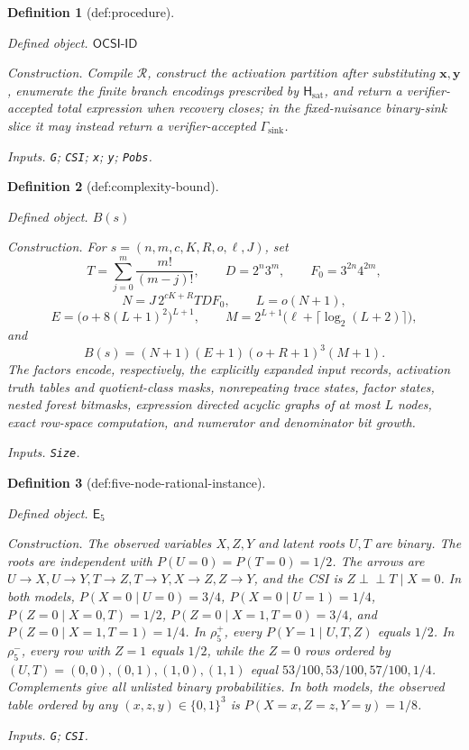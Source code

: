 \documentclass{article}
\newtheorem{definition}{Definition}
\begin{document}
\begin{definition}[def:procedure]\label{def:procedure}
\par\smallskip\noindent\emph{Defined object.} \(\mathsf{OCSI\text{-}ID}\)
\par\smallskip\noindent\emph{Construction.} Compile \(\mathcal R\), construct the activation partition after substituting \(\mathbf x,\mathbf y\), enumerate the finite branch encodings prescribed by \(\mathsf H_{\mathrm{sat}}\), and return a verifier-accepted total expression when recovery closes; in the fixed-nuisance binary-sink slice it may instead return a verifier-accepted \(\Gamma_{\mathrm{sink}}\).
\par\smallskip\noindent\emph{Inputs.} \texttt{G}; \texttt{CSI}; \texttt{x}; \texttt{y}; \texttt{Pobs}.
\end{definition}

\begin{definition}[def:complexity-bound]\label{def:complexity-bound}
\par\smallskip\noindent\emph{Defined object.} \(B(s)\)
\par\smallskip\noindent\emph{Construction.} For \(s=(n,m,c,K,R,o,\ell,J)\), set
\[
 T=\sum_{j=0}^{m}\frac{m!}{(m-j)!},\qquad
 D=2^n3^m,\qquad
 F_0=3^{2n}4^{2m},
\]
\[
 N=J\,2^{cK+R}TDF_0,\qquad L=o(N+1),
\]
\[
 E=\bigl(o+8(L+1)^2\bigr)^{L+1},\qquad
 M=2^{L+1}\bigl(\ell+\lceil\log_2(L+2)\rceil\bigr),
\]
and
\[
 B(s)=(N+1)(E+1)(o+R+1)^3(M+1).
\]
The factors encode, respectively, the explicitly expanded input records, activation truth tables and quotient-class masks, nonrepeating trace states, factor states, nested forest bitmasks, expression directed acyclic graphs of at most \(L\) nodes, exact row-space computation, and numerator and denominator bit growth.
\par\smallskip\noindent\emph{Inputs.} \texttt{Size}.
\end{definition}

\begin{definition}[def:five-node-rational-instance]\label{def:five-node-rational-instance}
\par\smallskip\noindent\emph{Defined object.} \(\mathsf E_5\)
\par\smallskip\noindent\emph{Construction.} The observed variables \(X,Z,Y\) and latent roots \(U,T\) are binary. The roots are independent with \(P(U=0)=P(T=0)=1/2\). The arrows are \(U\to X,U\to Y,T\to Z,T\to Y,X\to Z,Z\to Y\), and the CSI is \(Z\mathbin{\perp\!\!\!\perp}T\mid X=0\). In both models, \(P(X=0\mid U=0)=3/4\), \(P(X=0\mid U=1)=1/4\), \(P(Z=0\mid X=0,T)=1/2\), \(P(Z=0\mid X=1,T=0)=3/4\), and \(P(Z=0\mid X=1,T=1)=1/4\). In \(\rho^+_5\), every \(P(Y=1\mid U,T,Z)\) equals \(1/2\). In \(\rho^-_5\), every row with \(Z=1\) equals \(1/2\), while the \(Z=0\) rows ordered by \((U,T)=(0,0),(0,1),(1,0),(1,1)\) equal \(53/100,53/100,57/100,1/4\). Complements give all unlisted binary probabilities. In both models, the observed table ordered by any \((x,z,y)\in\{0,1\}^3\) is \(P(X=x,Z=z,Y=y)=1/8\).
\par\smallskip\noindent\emph{Inputs.} \texttt{G}; \texttt{CSI}.
\end{definition}
\end{document}
